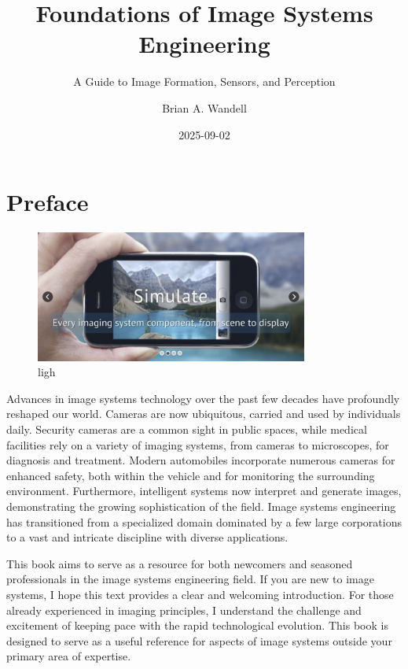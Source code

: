\documentclass[
  letterpaper,
]{book}
\title{Foundations of Image Systems Engineering}
\subtitle{A Guide to Image Formation, Sensors, and Perception}
\author{Brian A. Wandell}
\date{2025-09-02}
\renewcommand*\contentsname{Table of contents}
\newcommand\contentsname{Table of contents}
\begin{document}
\frontmatter
\maketitle

\renewcommand*\contentsname{Table of contents}
{
\setcounter{tocdepth}{2}
\tableofcontents
}

\mainmatter
{}

\chapter*{Preface}\label{sec-preface}


\begin{figure}[H]

{\centering \includegraphics[width=0.8\textwidth,height=\textheight]{chapters/images/front-simulate.png}

}

\caption{ligh}

\end{figure}%

Advances in image systems technology over the past few decades have
profoundly reshaped our world. Cameras are now ubiquitous, carried and
used by individuals daily. Security cameras are a common sight in public
spaces, while medical facilities rely on a variety of imaging systems,
from cameras to microscopes, for diagnosis and treatment. Modern
automobiles incorporate numerous cameras for enhanced safety, both
within the vehicle and for monitoring the surrounding environment.
Furthermore, intelligent systems now interpret and generate images,
demonstrating the growing sophistication of the field. Image systems
engineering has transitioned from a specialized domain dominated by a
few large corporations to a vast and intricate discipline with diverse
applications.

This book aims to serve as a resource for both newcomers and seasoned
professionals in the image systems engineering field. If you are new to
image systems, I hope this text provides a clear and welcoming
introduction. For those already experienced in imaging principles, I
understand the challenge and excitement of keeping pace with the rapid
technological evolution. This book is designed to serve as a useful
reference for aspects of image systems outside your primary area of
expertise.
\end{document}
